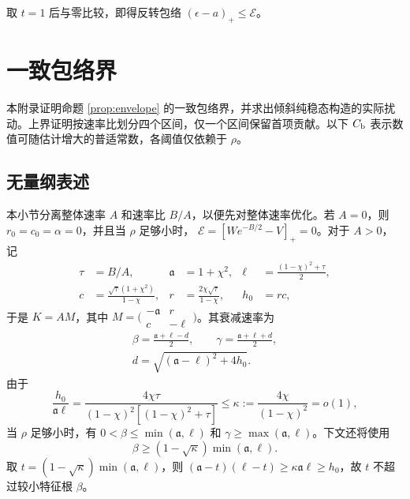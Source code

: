 \documentclass[aps,pra,reprint,amsmath,amssymb,nofootinbib,floatfix,longbibliography]{revtex4-2}
\theoremstyle{aps}
\newcommand{\eps}{\epsilon}
\begin{document}
取 $t=1$ 后与零比较，即得反转包络 $(\eps-a)_+\le\mathcal E$。

\section{一致包络界}\label{app:envelope}\label{sec:envelope}

本附录证明命题 \ref{prop:envelope} 的一致包络界，并求出倾斜纯稳态构造的实际扰动。上界证明按速率比划分四个区间，仅一个区间保留首项贡献。以下 $C_{\rm b}$ 表示数值可随估计增大的普适常数，各阈值仅依赖于 $\rho$。

\subsection{无量纲表述}

本小节分离整体速率 $A$ 和速率比 $B/A$，以便先对整体速率优化。若 $A=0$，则 $r_0=c_0=\alpha=0$，并且当 $\rho$ 足够小时，
$\mathcal E=[We^{-B/2}-V]_+=0$。对于 $A>0$，记
\begin{align}
 \tau&=B/A,& \mathfrak a&=1+\chi^2,&
 \ell&=\frac{(1-\chi)^2+\tau}{2},\nonumber\\
 c&=\frac{\sqrt\tau(1+\chi^2)}{1-\chi},&
 r&=\frac{2\chi\sqrt\tau}{1-\chi},&
 h_0&=rc,\label{eq:dimensionless}
\end{align}
于是 $K=AM$，其中 $M=\bigl(\begin{smallmatrix}-\mathfrak a&r\\c&-\ell\end{smallmatrix}\bigr)$。其衰减速率为
\begin{equation}\label{eq:rates}
 \begin{gathered}
 \beta=\frac{\mathfrak a+\ell-d}{2},\qquad
 \gamma=\frac{\mathfrak a+\ell+d}{2},\\
 d=\sqrt{(\mathfrak a-\ell)^2+4h_0}.
 \end{gathered}
\end{equation}
由于
\begin{equation}\label{eq:kappa}
 \frac{h_0}{\mathfrak a\ell}
 =\frac{4\chi\tau}{(1-\chi)^2[(1-\chi)^2+\tau]}
 \le\kappa:=\frac{4\chi}{(1-\chi)^2}=o(1),
\end{equation}
当 $\rho$ 足够小时，有 $0<\beta\le\min(\mathfrak a,\ell)$ 和 $\gamma\ge\max(\mathfrak a,\ell)$。下文还将使用
\begin{equation}\label{eq:beta-lower}
 \beta\ge(1-\sqrt\kappa)\min(\mathfrak a,\ell).
\end{equation}
取 $t=(1-\sqrt\kappa)\min(\mathfrak a,\ell)$，则 $(\mathfrak a-t)(\ell-t)\ge\kappa\mathfrak a\ell\ge h_0$，故 $t$ 不超过较小特征根 $\beta$。
\end{document}
